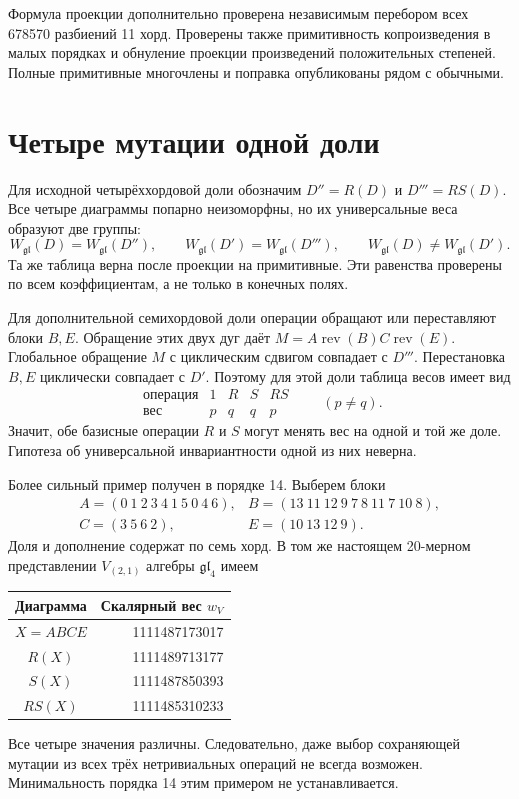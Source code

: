 \documentclass[11pt,a4paper]{article}
\numberwithin{equation}{section}
\theoremstyle{definition}
\theoremstyle{remark}
\newcommand{\gl}{\mathfrak{gl}}
\newcommand{\W}{W_{\gl}}
\newcommand{\rev}{\operatorname{rev}}
\begin{document}
Формула проекции дополнительно проверена независимым перебором всех
678570 разбиений 11 хорд. Проверены также примитивность копроизведения
в малых порядках и обнуление проекции произведений положительных степеней.
Полные примитивные многочлены и поправка опубликованы рядом с обычными.

\section{Четыре мутации одной доли}
\label{sec:mutants14}

Для исходной четырёххордовой доли обозначим $D''=R(D)$ и $D'''=RS(D)$.
Все четыре диаграммы попарно неизоморфны, но их универсальные веса
образуют две группы:
\begin{equation}\label{eq:four11}
 \W(D)=\W(D''),\qquad\W(D')=\W(D'''),\qquad\W(D)\ne\W(D').
\end{equation}
Та же таблица верна после проекции на примитивные. Эти равенства
проверены по всем коэффициентам, а не только в конечных полях.

Для дополнительной семихордовой доли операции обращают или переставляют
блоки $B,E$. Обращение этих двух дуг даёт
$M=A\rev(B)C\rev(E)$. Глобальное обращение $M$ с циклическим сдвигом
совпадает с $D'''$. Перестановка $B,E$ циклически совпадает с $D'$.
Поэтому для этой доли таблица весов имеет вид
\[
 \begin{array}{c|rrrr}
 \text{операция}&1&R&S&RS\\\hline
 \text{вес}&p&q&q&p
 \end{array}\qquad(p\ne q).
\]
Значит, обе базисные операции $R$ и $S$ могут менять вес на одной и той же
доле. Гипотеза об универсальной инвариантности одной из них неверна.

Более сильный пример получен в порядке 14. Выберем блоки
\[
\begin{array}{ll}
 A=(0\ 1\ 2\ 3\ 4\ 1\ 5\ 0\ 4\ 6),&
 B=(13\ 11\ 12\ 9\ 7\ 8\ 11\ 7\ 10\ 8),\\
 C=(3\ 5\ 6\ 2),&E=(10\ 13\ 12\ 9).
\end{array}
\]
Доля и дополнение содержат по семь хорд. В том же настоящем
20-мерном представлении $V_{(2,1)}$ алгебры $\gl_4$ имеем
\begin{center}
\begin{tabular}{cr}
\toprule
Диаграмма&Скалярный вес $w_V$\\\midrule
$X=ABCE$&1111487173017\\
$R(X)$&1111489713177\\
$S(X)$&1111487850393\\
$RS(X)$&1111485310233\\\bottomrule
\end{tabular}
\end{center}
Все четыре значения различны. Следовательно, даже выбор сохраняющей
мутации из всех трёх нетривиальных операций не всегда возможен.
Минимальность порядка 14 этим примером не устанавливается.
\end{document}
